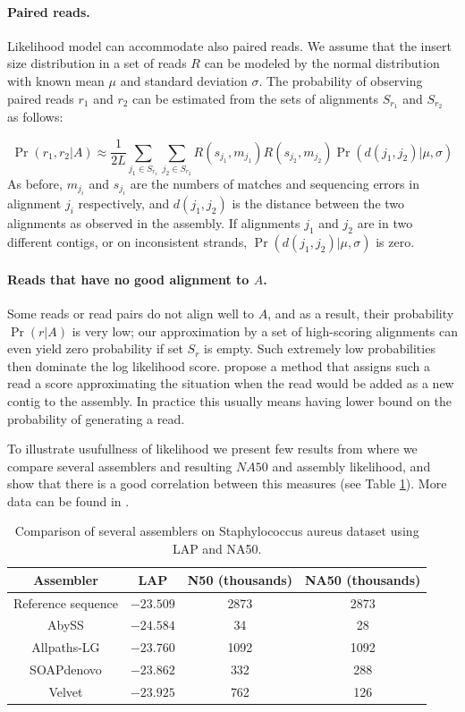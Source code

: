 \paragraph{Paired reads.}
Likelihood model can accommodate also paired reads.
We assume that the insert size distribution in a set of reads $R$ 
can be modeled by the normal
distribution with known mean $\mu$ and standard deviation $\sigma$.
The probability of observing paired reads $r_1$ and $r_2$ 
can be estimated from the sets of alignments $S_{r_1}$ and $S_{r_2}$ as follows:

\begin{equation}
\Pr(r_1, r_2|A) \approx 
\frac{1}{2L}
\displaystyle\sum_{j_1 \in S_{r_1}} 
\displaystyle\sum_{j_2 \in S_{r_2}} 
R(s_{j_1}, m_{j_1}) R(s_{j_2}, m_{j_2})
\Pr(d(j_1, j_2)|\mu, \sigma)
\end{equation}
As before, $m_{j_i}$ and $s_{j_i}$ are the numbers of matches and
sequencing errors in alignment $j_i$ respectively, 
and $d(j_1,j_2)$ is the distance between the two alignments
as observed in the assembly. 
If alignments $j_1$ and $j_2$ are in two different contigs,
or on inconsistent strands, $\Pr(d(j_1, j_2)|\mu, \sigma)$ is zero.

\paragraph{Reads that have no good alignment to $A$.}
Some reads or read pairs do not align well to $A$, and as a result, their
probability $\Pr(r|A)$ is very low; our approximation by a set of
high-scoring alignments can even yield zero probability if set $S_r$
is empty.  Such extremely low probabilities then dominate the log
likelihood score. \citet{Ghodsi2013} propose a method that assigns
such a read a score approximating the situation when the read would be
added as a new contig to the assembly. In practice this usually
means having lower bound on the probability of generating a read.

To illustrate usufullness of likelihood we present
few results from \citet{Ghodsi2013} where we compare
several assemblers and resulting $NA50$ and assembly likelihood,
and show that there is a good correlation between this measures (see Table
\ref{tab:like}). More data can be found in \citet{Ghodsi2013}.

\begin{table}
\centering
\begin{tabular}{|c|c|c|c|}
\hline
Assembler & LAP & N50 (thousands) & NA50 (thousands) \\\hline
Reference sequence & $-23.509$ & 2873 & 2873 \\\hline
AbySS & $-24.584$ & 34 & 28 \\\hline
Allpaths-LG & $-23.760$ & 1092 & 1092 \\\hline
SOAPdenovo & $-23.862$ & 332 & 288 \\\hline
Velvet & $-23.925$ & 762 & 126  \\\hline
\end{tabular}
\caption{Comparison of several assemblers on Staphylococcus aureus dataset
using LAP and NA50.}
\label{tab:like}
\end{table}

